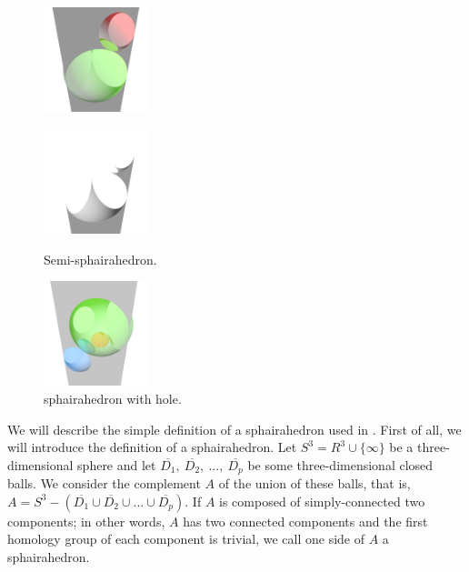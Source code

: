 \documentclass[dvipdfmx]{interact}
\theoremstyle{plain}%
\theoremstyle{definition}
\theoremstyle{remark}
\theoremstyle{problemstyle}
\begin{document}
\begin{figure}[h!tbp]
\begin{minipage}[t]{0.4\textwidth}
  \centering
  \begin{minipage}[t]{0.19\textwidth}
   \includegraphics[width=1.2in, height=1.2in,
   keepaspectratio]{./img/sphairahedralPrism/semiSphairaAll.png}
   \label{fig:semi-sphairaAll}
  \end{minipage}
  \hspace*{\fill}
  \begin{minipage}[t]{0.19\textwidth}
   \includegraphics[width=1.2in, height=1.2in,
   keepaspectratio]{./img/sphairahedralPrism/semiSphairaHalf.png}
   \label{fig:semi-sphairaHalf}
  \end{minipage}
  \hspace*{\fill}
  \caption{Semi-sphairahedron.}
  \label{fig:semi-sphairahedron}
 \end{minipage}
\end{figure}

\begin{figure}[h!tbp]
  \centering
 \includegraphics[width=1.2in, height=1.2in,
 keepaspectratio]{./img/sphairahedralPrism/hole.png}
 \caption{sphairahedron with hole.}
  \label{fig:brokenHole}
\end{figure}

We will describe the simple definition of a sphairahedron used in \cite{bridges2018}.
First of all, we will introduce the definition of a sphairahedron.
Let $S^3 = R^3 \cup \{\infty\}$ be a three-dimensional sphere and let
$\overline{D_1},~\overline{D_2},~...,~\overline{D_p}$ be some
three-dimensional closed balls.
We consider the complement $A$ of the union of these balls, that is,
$A = S^3 - (\overline{D_1} \cup \overline{D_2} \cup ... \cup \overline{D_p})$.
If $A$ is composed of simply-connected two components;
in other words, $A$ has two connected components and the first homology
group of each component is trivial, we call one side of $A$
a sphairahedron.
\end{document}
